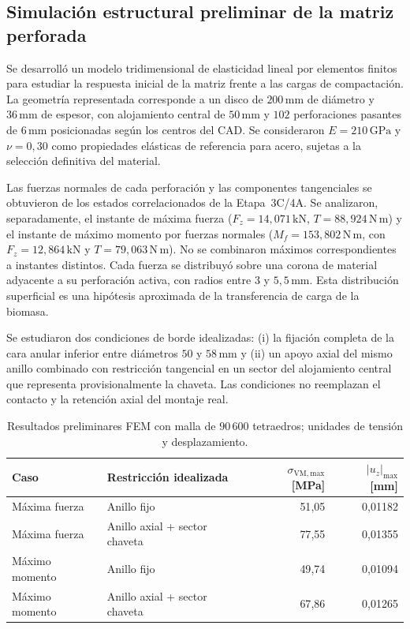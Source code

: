 \subsection{Simulación estructural preliminar de la matriz perforada}

Se desarrolló un modelo tridimensional de elasticidad lineal por elementos finitos
para estudiar la respuesta inicial de la matriz frente a las cargas de compactación.
La geometría representada corresponde a un disco de $200\,\mathrm{mm}$ de diámetro y
$36\,\mathrm{mm}$ de espesor, con alojamiento central de $50\,\mathrm{mm}$ y
$102$ perforaciones pasantes de $6\,\mathrm{mm}$ posicionadas según los centros del CAD.
Se consideraron $E=210\,\mathrm{GPa}$ y $\nu=0{,}30$ como propiedades elásticas de
referencia para acero, sujetas a la selección definitiva del material.

Las fuerzas normales de cada perforación y las componentes tangenciales se obtuvieron
de los estados correlacionados de la Etapa~3C/4A. Se analizaron, separadamente,
el instante de máxima fuerza ($F_z=14{,}071\,\mathrm{kN}$,
$T=88{,}924\,\mathrm{N\,m}$) y el instante de máximo momento por fuerzas normales
($M_f=153{,}802\,\mathrm{N\,m}$, con $F_z=12{,}864\,\mathrm{kN}$ y
$T=79{,}063\,\mathrm{N\,m}$). No se combinaron máximos correspondientes a instantes distintos.
Cada fuerza se distribuyó sobre una corona de material adyacente a su perforación
activa, con radios entre $3$ y $5{,}5\,\mathrm{mm}$. Esta distribución superficial
es una hipótesis aproximada de la transferencia de carga de la biomasa.

Se estudiaron dos condiciones de borde idealizadas: (i) la fijación completa de
la cara anular inferior entre diámetros $50$ y $58\,\mathrm{mm}$ y (ii) un apoyo
axial del mismo anillo combinado con restricción tangencial en un sector del
alojamiento central que representa provisionalmente la chaveta. Las condiciones
no reemplazan el contacto y la retención axial del montaje real.

\begin{table}[htbp]
\centering
\caption{Resultados preliminares FEM con malla de $90\,600$ tetraedros; unidades de tensión y desplazamiento.}
\label{tab:fem_matriz_4D}
\small
\begin{tabular}{llrr}
\hline
Caso & Restricción idealizada & $\sigma_{\mathrm{VM,max}}$ [MPa] & $|u_z|_{\max}$ [mm] \\
\hline
Máxima fuerza & Anillo fijo & 51{,}05 & 0{,}01182 \\
Máxima fuerza & Anillo axial + sector chaveta & 77{,}55 & 0{,}01355 \\
Máximo momento & Anillo fijo & 49{,}74 & 0{,}01094 \\
Máximo momento & Anillo axial + sector chaveta & 67{,}86 & 0{,}01265 \\
\hline
\end{tabular}
\end{table}

